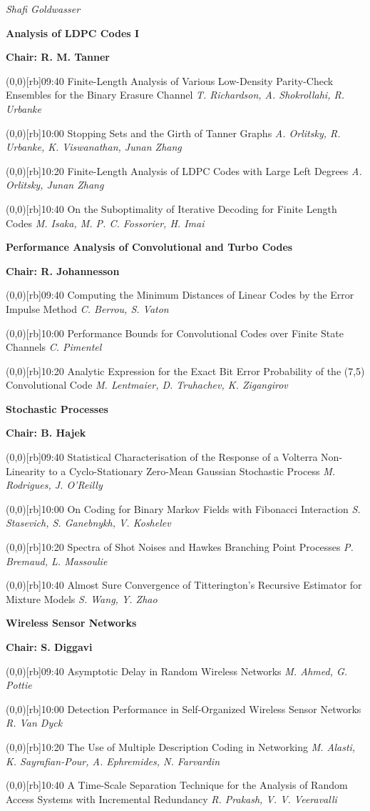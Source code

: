 \documentclass[a5paper,twoside]{article}
\def\period#1{\flushleft{\large\bfseries #1}\markboth{\sf #1}{\sf #1}}
\def\sesstitle#1{\vspace{.45\bigskipamount}\par{\bfseries #1}\par}
\def\sesschair#1{{\bfseries Chair: #1}\par\vspace{.65\medskipamount}}
\def\papertime#1{\makebox(0,0)[rb]{{\scriptsize #1}\hspace{.5em}}}
\def\papertitle#1{#1\hfil\break}
\def\paperauthors#1{{\itshape #1}\par\filbreak\vspace{.65\medskipamount}}
\def\plenaryspeaker#1{{\itshape #1}\par\filbreak\vspace{\medskipamount}}
\begin{document}
\plenaryspeaker{Shafi Goldwasser}
\clearpage
\period{Mon 09:40 -- 11:00}
\sesstitle{Analysis of LDPC Codes I}
\sesschair{R. M. Tanner}
\papertime{09:40}%
\papertitle{Finite-Length Analysis of Various Low-Density Parity-Check Ensembles for the Binary Erasure Channel}
\paperauthors{T. Richardson, A. Shokrollahi, R. Urbanke}
\papertime{10:00}%
\papertitle{Stopping Sets and the Girth of Tanner Graphs}
\paperauthors{A. Orlitsky, R. Urbanke, K. Viswanathan, Junan Zhang}
\papertime{10:20}%
\papertitle{Finite-Length Analysis of LDPC Codes with Large Left Degrees}
\paperauthors{A. Orlitsky, Junan Zhang}
\papertime{10:40}%
\papertitle{On the Suboptimality of Iterative Decoding for Finite Length Codes}
\paperauthors{M. Isaka, M. P. C. Fossorier, H. Imai}
\sesstitle{Performance Analysis of Convolutional and Turbo Codes}
\sesschair{R. Johannesson}
\papertime{09:40}%
\papertitle{Computing the Minimum Distances of Linear Codes by the Error Impulse Method}
\paperauthors{C. Berrou, S. Vaton}
\papertime{10:00}%
\papertitle{Performance Bounds for Convolutional Codes over Finite State Channels}
\paperauthors{C. Pimentel}
\papertime{10:20}%
\papertitle{Analytic Expression for the Exact Bit Error Probability of the (7,5) Convolutional Code}
\paperauthors{M. Lentmaier, D. Truhachev, K. Zigangirov}
\sesstitle{Stochastic Processes}
\sesschair{B. Hajek}
\papertime{09:40}%
\papertitle{Statistical Characterisation of the Response of a Volterra Non-Linearity to a Cyclo-Stationary Zero-Mean Gaussian Stochastic Process}
\paperauthors{M. Rodrigues, J. O'Reilly}
\papertime{10:00}%
\papertitle{On Coding for Binary Markov Fields with Fibonacci Interaction}
\paperauthors{S. Stasevich, S. Ganebnykh, V. Koshelev}
\papertime{10:20}%
\papertitle{Spectra of Shot Noises and Hawkes Branching Point Processes}
\paperauthors{P. Bremaud, L. Massoulie}
\papertime{10:40}%
\papertitle{Almost Sure Convergence of Titterington's Recursive Estimator for Mixture Models}
\paperauthors{S. Wang, Y. Zhao}
\sesstitle{Wireless Sensor Networks}
\sesschair{S. Diggavi}
\papertime{09:40}%
\papertitle{Asymptotic Delay in Random Wireless Networks}
\paperauthors{M. Ahmed, G. Pottie}
\papertime{10:00}%
\papertitle{Detection Performance in Self-Organized Wireless Sensor Networks}
\paperauthors{R. Van Dyck}
\papertime{10:20}%
\papertitle{The Use of Multiple Description Coding in Networking}
\paperauthors{M. Alasti, K. Sayrafian-Pour, A. Ephremides, N. Farvardin}
\papertime{10:40}%
\papertitle{A Time-Scale Separation Technique for the Analysis of Random Access Systems with Incremental Redundancy}
\paperauthors{R. Prakash, V. V. Veeravalli}
\end{document}
